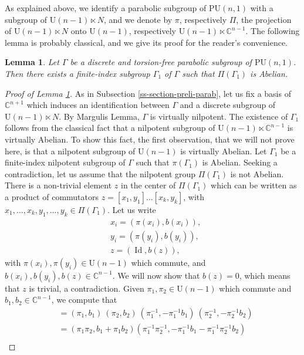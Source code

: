 \documentclass{article}
\newtheorem{lemma}[theorem]{Lemma}
\theoremstyle{definition}
\theoremstyle{remark}
\newcommand{\C}{\mathbb{C}}
\newcommand{\PU}{\mathrm{PU}}
\DeclareMathOperator{\Id}{\text{Id}}
\begin{document}
	As explained above, we identify a parabolic subgroup of $\PU(n,1)$ with a subgroup of $\mathrm{U}(n-1)\ltimes N$, and we denote by $\pi$, respectively $\Pi $, the projection of $\mathrm{U}(n-1)\ltimes N$ onto $\mathrm{U}(n-1)$, respectively $ \mathrm{U}(n-1)\ltimes \C^{n-1}$. The following lemma is probably classical, and we give its proof for the reader's convenience.
	
	\begin{lemma}\label{lem-ssgrp-pi-abelien}
		Let $\Gamma$ be a discrete and torsion-free parabolic subgroup of $\PU(n,1)$. Then there exists a finite-index subgroup $\Gamma_1$ of $\Gamma$ such that $\Pi(\Gamma_1)$ is Abelian.
	\end{lemma}
	
	\begin{proof}[Proof of Lemma \ref{lem-ssgrp-pi-abelien}]
		As in Subsection \ref{ss-section-preli-parab}, let us fix a basis of $\C^{n+1}$ which induces an identification between $\Gamma$ and a discrete subgroup of $\mathrm{U}(n-1)\ltimes N$. By Margulis Lemma, $\Gamma$ is virtually nilpotent. The existence of $\Gamma_1$ follows from the classical fact that a nilpotent subgroup of $\mathrm{U}(n-1)\ltimes \C^{n-1}$ is virtually Abelian. To show this fact, the first observation, that we will not prove here, is that a nilpotent subgroup of $\mathrm{U}(n-1)$ is virtually Abelian. Let $\Gamma_1$ be a finite-index nilpotent subgroup of $\Gamma$ such that $\pi(\Gamma_1)$ is Abelian. Seeking a contradiction, let us assume that the nilpotent group $\Pi(\Gamma_1)$ is not Abelian. There is a non-trivial element $z$ in the center of $\Pi(\Gamma_1)$ which can be written as a product of commutators $z=[x_1,y_1]\dots[x_k,y_k]$, with $x_1,\dots,x_k,y_1,\dots,y_k\in \Pi(\Gamma_1)$. Let us write\begin{align*}
			&x_i=(\pi(x_i),b(x_i)),\\
			&y_i=(\pi(y_i),b(y_i)),\\
			&z= (\Id,b(z)), 
		\end{align*}
		with $\pi(x_i),\pi(y_i)\in \mathrm{U}(n-1)$ which commute, and $b(x_i),b(y_i),b(z)\in \C^{n-1}$. We will now show that $b(z)=0$, which means that $z$ is trivial, a contradiction.
		Given $\pi_1,\pi_2\in \mathrm{U}(n-1)$ which commute and $b_1,b_2\in \C^{n-1}$, we compute that \begin{align*}
			[(\pi_1,b_1),(\pi_2,b_2)]&=(\pi_1,b_1)\ (\pi_2,b_2)\ (\pi_1^{-1},-\pi_1^{-1}b_1)\ (\pi_2^{-1},-\pi_2^{-1}b_2) \\
			&= (\pi_1\pi_2,b_1+\pi_1b_2)(\pi_1^{-1}\pi_2^{-1},-\pi_1^{-1}b_1 - \pi_1^{-1}\pi_2^{-1}b_2)\\

\end{align*}
\end{proof}
\end{document}
